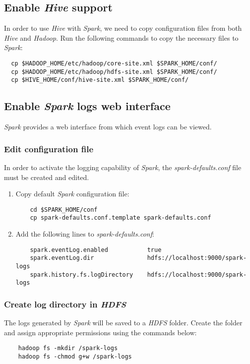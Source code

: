 \documentclass{article}
\begin{document}
  \subsection{Enable \emph{Hive} support}
  In order to use \emph{Hive} with \emph{Spark}, we need to copy configuration files from both
  \emph{Hive} and \emph{Hadoop}. Run the following commands to copy the necessary files to
  \emph{Spark}:
  \begin{verbatim}
  cp $HADOOP_HOME/etc/hadoop/core-site.xml $SPARK_HOME/conf/
  cp $HADOOP_HOME/etc/hadoop/hdfs-site.xml $SPARK_HOME/conf/
  cp $HIVE_HOME/conf/hive-site.xml $SPARK_HOME/conf/
  \end{verbatim}

  \subsection{Enable \emph{Spark} logs web interface}
  \emph{Spark} provides a web interface from which event logs can be viewed.
    \subsubsection{Edit configuration file}
    In order to activate the logging capability of \emph{Spark}, the \emph{spark-defaults.conf}
    file must be created and edited.
    \begin{enumerate}
    \item Copy default \emph{Spark} configuration file:
    \begin{verbatim}
    cd $SPARK_HOME/conf
    cp spark-defaults.conf.template spark-defaults.conf
    \end{verbatim}

    \item Add the following lines to \emph{spark-defaults.conf}:
    \begin{verbatim}
    spark.eventLog.enabled           true
    spark.eventLog.dir               hdfs://localhost:9000/spark-logs
    spark.history.fs.logDirectory    hdfs://localhost:9000/spark-logs
    \end{verbatim}
    \end{enumerate}

    \subsubsection{Create log directory in \emph{HDFS}}
    The logs generated by \emph{Spark} will be saved to a \emph{HDFS} folder. Create the folder
    and assign appropriate permissions using the commands below:
    \begin{verbatim}
    hadoop fs -mkdir /spark-logs
    hadoop fs -chmod g+w /spark-logs
    \end{verbatim}
\end{document}
